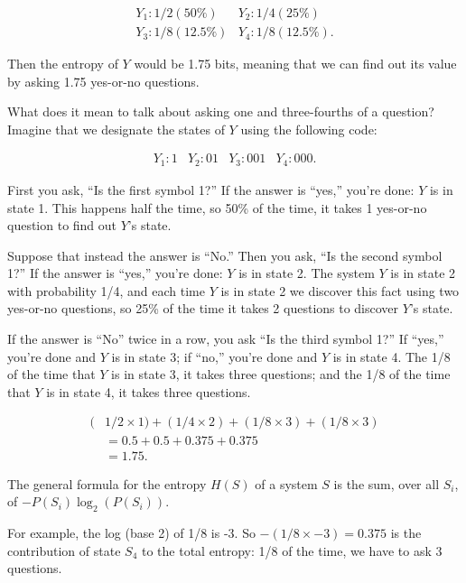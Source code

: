 {{\begin{equation*}
  \begin{array}{ll}
 Y_{1} : 1/2 (50\%) &  Y_{2} : 1/4 (25\%)\\
 Y_{3} : 1/8 (12.5\%) &  Y_{4} : 1/8 (12.5\%).
  \end{array}
\end{equation*}


{
 Then the entropy of $Y$ would be 1.75 bits, meaning that we can find
out its value by asking 1.75 yes-or-no questions.}

{
 What does it mean to talk about asking one and three-fourths of a
question? Imagine that we designate the states of $Y$ using the following
code:}

\begin{equation*}
  \begin{array}{llll}
 Y_{1} : 1 &  Y_{2} : 01 &  Y_{3} : 001 &  Y_{4} : 000.
  \end{array}
\end{equation*}


{
 First you ask, ``Is the first symbol
1?'' If the answer is
``yes,'' you're
done: $Y$ is in state 1. This happens half the time, so 50\% of the time,
it takes 1 yes-or-no question to find out $Y$'s state.}

{
 Suppose that instead the answer is
``No.'' Then you ask,
``Is the second symbol 1?'' If the
answer is ``yes,''
you're done: $Y$ is in state 2. The system $Y$ is in state
2 with probability 1/4, and each time $Y$ is in state 2 we discover this
fact using two yes-or-no questions, so 25\% of the time it takes 2
questions to discover $Y$'s state.}

{
 If the answer is ``No'' twice
in a row, you ask ``Is the third symbol
1?'' If ``yes,''
you're done and $Y$ is in state 3; if
``no,'' you're done
and $Y$ is in state 4. The 1/8 of the time that $Y$ is in state 3, it takes
three questions; and the 1/8 of the time that $Y$ is in state 4, it takes
three questions.}

\begin{align*}
 (&1/2 \times 1) + (1/4 \times 2) + (1/8 \times 3) + (1/8 \times 3) \\
  &= 0.5 + 0.5 + 0.375 + 0.375 \\
 &= 1.75.
\end{align*}

{
 The general formula for the entropy $H(S)$ of a system $S$ is the sum,
over all $S_{i}$, of
$-P(S_{i})\log_{2}(P(S_{i}))$.}

{
 For example, the log (base 2) of 1/8 is -3. So $-(1/8
\times -3) = 0.375$ is the contribution of state
$S_{4}$ to the total entropy: 1/8 of the time, we have to
ask 3 questions.}

}}
